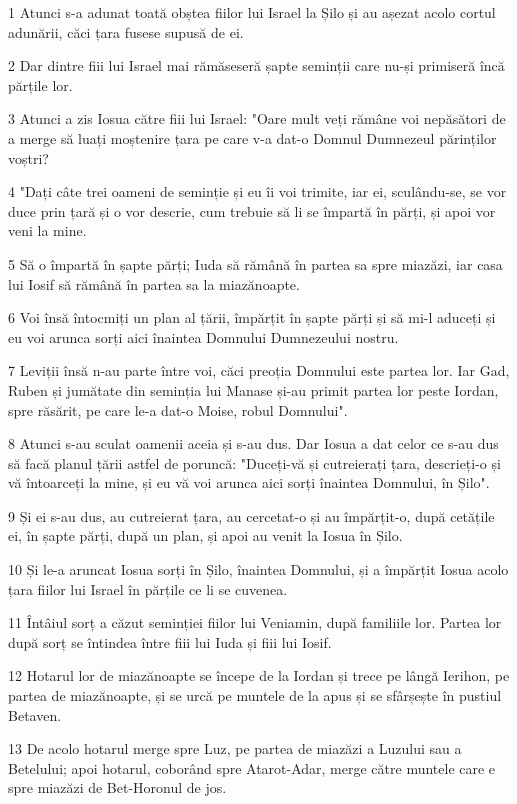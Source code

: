 \par 1 Atunci s-a adunat toată obștea fiilor lui Israel la Șilo și au așezat acolo cortul adunării, căci țara fusese supusă de ei.
\par 2 Dar dintre fiii lui Israel mai rămăseseră șapte seminții care nu-și primiseră încă părțile lor.
\par 3 Atunci a zis Iosua către fiii lui Israel: "Oare mult veți rămâne voi nepăsători de a merge să luați moștenire țara pe care v-a dat-o Domnul Dumnezeul părinților voștri?
\par 4 "Dați câte trei oameni de seminție și eu îi voi trimite, iar ei, sculându-se, se vor duce prin țară și o vor descrie, cum trebuie să li se împartă în părți, și apoi vor veni la mine.
\par 5 Să o împartă în șapte părți; Iuda să rămână în partea sa spre miazăzi, iar casa lui Iosif să rămână în partea sa la miazănoapte.
\par 6 Voi însă întocmiți un plan al țării, împărțit în șapte părți și să mi-l aduceți și eu voi arunca sorți aici înaintea Domnului Dumnezeului nostru.
\par 7 Leviții însă n-au parte între voi, căci preoția Domnului este partea lor. Iar Gad, Ruben și jumătate din seminția lui Manase și-au primit partea lor peste Iordan, spre răsărit, pe care le-a dat-o Moise, robul Domnului".
\par 8 Atunci s-au sculat oamenii aceia și s-au dus. Dar Iosua a dat celor ce s-au dus să facă planul țării astfel de poruncă: "Duceți-vă și cutreierați țara, descrieți-o și vă întoarceți la mine, și eu vă voi arunca aici sorți înaintea Domnului, în Șilo".
\par 9 Și ei s-au dus, au cutreierat țara, au cercetat-o și au împărțit-o, după cetățile ei, în șapte părți, după un plan, și apoi au venit la Iosua în Șilo.
\par 10 Și le-a aruncat Iosua sorți în Șilo, înaintea Domnului, și a împărțit Iosua acolo țara fiilor lui Israel în părțile ce li se cuvenea.
\par 11 Întâiul sorț a căzut seminției fiilor lui Veniamin, după familiile lor. Partea lor după sorț se întindea între fiii lui Iuda și fiii lui Iosif.
\par 12 Hotarul lor de miazănoapte se începe de la Iordan și trece pe lângă Ierihon, pe partea de miazănoapte, și se urcă pe muntele de la apus și se sfârșește în pustiul Betaven.
\par 13 De acolo hotarul merge spre Luz, pe partea de miazăzi a Luzului sau a Betelului; apoi hotarul, coborând spre Atarot-Adar, merge către muntele care e spre miazăzi de Bet-Horonul de jos.
